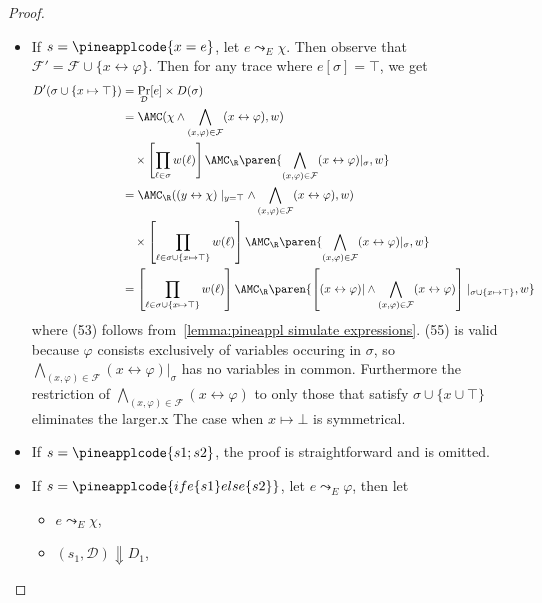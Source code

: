 \begin{proof}
\begin{itemize}[leftmargin=*]
    \item If $s = \pineapplcode{x = e}$, let $e \leadsto_E \chi$.
    Then observe that $\mathcal F' =\mathcal F \cup \{x \leftrightarrow \varphi\}$.
    Then for any trace where $e[\sigma] = \top$, we get
    \begin{align}
      D'(\sigma \cup \{x \mapsto \top\})
        &= \Pr_{\mathcal D}[e] \times D(\sigma)\\
        &= \AMC(\chi \land \bigwedge_{(x, \varphi) \in \mathcal F} (x \leftrightarrow \varphi), w) \nonumber\\
        &\quad \times
        \left[ \prod_{\ell \in \sigma} w(\ell) \right]
        \AMC_{\R} \paren{
          \bigwedge_{(x, \varphi) \in \mathcal F} (x \leftrightarrow \varphi)|_{\sigma} , w
        }
        \\
        &= \AMC_{\R}((y \leftrightarrow \chi)\mid_{y = \top} \land \bigwedge_{(x, \varphi) \in \mathcal F} (x \leftrightarrow \varphi), w) \nonumber\\
        &\quad \times
        \left[ \prod_{\ell \in \sigma \cup \{x \mapsto \top\} } w(\ell) \right]
        \AMC_{\R} \paren{
          \bigwedge_{(x, \varphi) \in \mathcal F} (x \leftrightarrow \varphi)|_{\sigma} , w
        }
        \\
        &=
        \left[ \prod_{\ell \in \sigma \cup \{x \mapsto \top\} } w(\ell) \right]
        \AMC_{\R} \paren{
         \left[(x \leftrightarrow \varphi)| \land \bigwedge_{(x, \varphi) \in \mathcal F} (x \leftrightarrow \varphi)\right]\mid_{\sigma \cup \{x \mapsto \top\}} , w
        }
    \end{align}
    where (53) follows from~\cref{lemma:pineappl simulate expressions}.
    (55) is valid because $\varphi$ consists exclusively of variables occuring in $\sigma$,
    so $\bigwedge_{(x, \varphi) \in \mathcal F} (x \leftrightarrow \varphi)|_{\sigma}$ has no variables in common.
    Furthermore the restriction of $\bigwedge_{(x, \varphi) \in \mathcal F} (x \leftrightarrow \varphi)$ to only those
    that satisfy $\sigma \cup \{x \cup \top\}$ eliminates the larger.x
    The case when $x\mapsto \bot$ is symmetrical.
    \item If $s = \pineapplcode{s1 ; s2}$, the proof is straightforward and is omitted.
    \item If $s = \pineapplcode{if e \{s1\} else  \{s2\}}$, let $e \leadsto_E \varphi$, then let
    \begin{itemize}
      \item $e \leadsto_E \chi$,
      \item $(s_1, \mathcal D) \Downarrow D_1$,

\end{itemize}
\end{itemize}
\end{proof}
